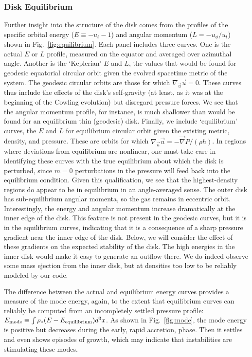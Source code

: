 \subsubsection{Disk Equilibrium}

Further insight into the structure of the disk comes from the profiles
of the specific orbital energy ($E\equiv-u_t-1$) and angular momentum
($L=-u_{\phi}/u_{t}$) shown in Fig.~\ref{fig:equilibrium}.  Each panel
includes three curves.  One is the actual $E$ or $L$ profile, measured
on the equator and averaged over azimuthal angle.  Another is the
`Keplerian' $E$ and $L$, the values that would be found for geodesic
equatorial circular orbit given the evolved spacetime metric of the
system.  The geodesic circular orbits are those for which
$\nabla_{\vec{u}}\vec{u}=0$.  These curves thus include the effects of
the disk's self-gravity (at least, as it was at the beginning of the
Cowling evolution) but disregard pressure forces.  We see that the angular
momentum profile, for instance, is much shallower than would be found
for an equilibrium thin (geodesic) disk.  Finally, we include
`equilibrium' curves, the $E$ and $L$ for equilibrium circular
orbit given the existing metric, density, and pressure.  These
are orbits for which $\nabla_{\vec{u}}\vec{u}=-\vec{\nabla}P/(\rho h)$. 
In regions
where deviations from equilibrium are nonlinear, one must take care
in identifying these curves with the true equilibrium about which the
disk is perturbed, since $m=0$ perturbations in the pressure will
feed back into the equilibrium condition.  Given this qualification,
we see that the highest-density regions do appear to be in equilibrium
in an angle-averaged sense.  The outer disk has sub-equilibrium
angular momenta, so the gas remains in eccentric orbit.  Interestingly,
the energy and angular momentum increase dramatically at the inner
edge of the disk.  This feature is not present in the geodesic curves,
but it is in the equilibrium curves, indicating that it is a consequence
of a sharp pressure gradient near the inner edge of the disk.  Below,
we will consider the effect of these gradients on the expected stability
of the disk.  The high
energies in the inner disk would make it easy to generate an outflow there. 
We do indeed observe some mass ejection from the inner disk, but at densities
too low to be reliably modeled by our code.

The difference between the actual and equilibrium energy curves provides a
measure of the mode energy, again, to the extent that equilibrium curves
can reliably be computed from an incompletely settled pressure profile: 
$E_{\rm mode}\equiv \int \rho_*(E-E_{\rm equilibrium})d^3x$.  As shown in
Fig.~\ref{fig:mode},
the mode energy
is positive but decreases during the early, rapid accretion, phase.  Then
it settles and even shows episodes of growth, which may indicate that
instabilities are stimulating these modes.

